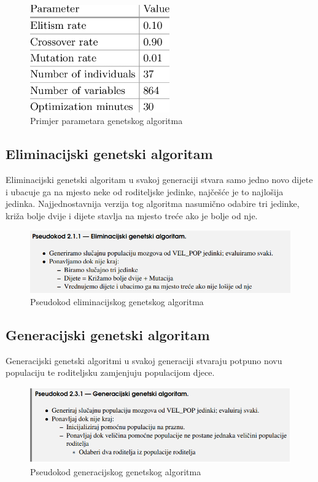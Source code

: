 \documentclass[times, utf8, zavrsni]{fer}
\begin{document}
	
	\begin{figure}[!htb]
		\centering
		\includegraphics[width=6cm]{slike/genAlgParams.png}
		\caption{Primjer parametara genetskog algoritma}
		\label{fig:gen-params}
		
	\end{figure}
	
	
	\subsection{Eliminacijski genetski algoritam}
	
	Eliminacijski genetski algoritam u svakoj generaciji stvara samo jedno novo dijete i ubacuje ga na mjesto neke od roditeljske jedinke, najčešće je to najlošija jedinka. Najjednostavnija verzija tog algoritma nasumično odabire tri jedinke, križa bolje dvije i dijete stavlja na mjesto treće ako je bolje od nje.
	
	\begin{figure}[!htb]
		\centering
		\includegraphics[width=15cm]{slike/elimGenAlg.png}
		\caption{Pseudokod eliminacijskog genetskog algoritma}
		\label{fig:elim-gen-alg}
	\end{figure}
	
	\subsection{Generacijski genetski algoritam}
	
	Generacijski genetski algoritmi u svakoj generaciji stvaraju potpuno novu populaciju te roditeljsku zamjenjuju populacijom djece. 
	
	
	\begin{figure}[!htb]
		\centering
		\includegraphics[width=15cm]{slike/genGenAlg.png}
		\caption{Pseudokod generacijskog genetskog algoritma}
		\label{fig:gen-gen-alg}
	\end{figure}
	
\end{document}
